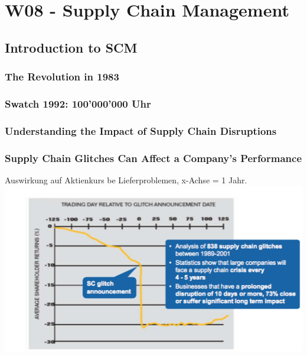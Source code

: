 \section{W08 - Supply Chain Management}
\subsection{Introduction to SCM }
\subsubsection{The Revolution in 1983}
\subsubsection{Swatch 1992: 100’000’000 Uhr }
\subsubsection{Understanding the Impact of Supply Chain Disruptions}
\subsubsection{Supply Chain Glitches Can Affect a Company’s Performance}
Auswirkung auf Aktienkurs be Lieferproblemen, x-Achse = 1 Jahr.\\
\includegraphics[width=1\textwidth]{W08/glitch}
